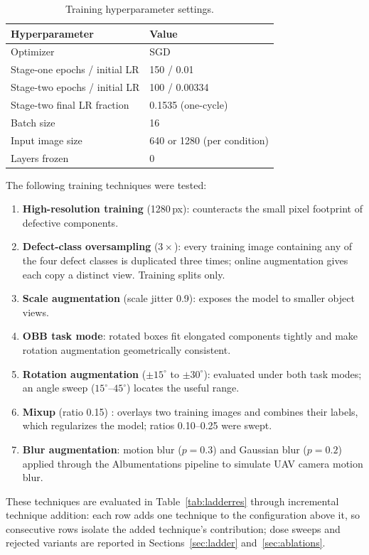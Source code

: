 \documentclass[conference]{IEEEtran}
\begin{document}
\begin{table}[t]
\caption{Training hyperparameter settings.}
\label{tab:hyper}
\centering
\footnotesize
\begin{tabular}{ll}
\toprule
Hyperparameter & Value \\
\midrule
Optimizer & SGD \\
Stage-one epochs / initial LR & 150 / 0.01 \\
Stage-two epochs / initial LR & 100 / 0.00334 \\
Stage-two final LR fraction & 0.1535 (one-cycle) \\
Batch size & 16 \\
Input image size & 640 or 1280 (per condition) \\
Layers frozen & 0 \\
\bottomrule
\end{tabular}
\end{table}

The following training techniques were tested:
\begin{enumerate}
\item \textbf{High-resolution training} (1280\,px): counteracts the small pixel footprint of defective components.
\item \textbf{Defect-class oversampling} ($3\times$): every training image containing any of the four defect classes is duplicated three times; online augmentation gives each copy a distinct view. Training splits only.
\item \textbf{Scale augmentation} (scale jitter 0.9): exposes the model to smaller object views.
\item \textbf{OBB task mode}: rotated boxes fit elongated components tightly and make rotation augmentation geometrically consistent.
\item \textbf{Rotation augmentation} ($\pm15^\circ$ to $\pm30^\circ$): evaluated under both task modes; an angle sweep ($15^\circ$--$45^\circ$) locates the useful range.
\item \textbf{Mixup} (ratio 0.15) \cite{zhang2018mixup}: overlays two training images and combines their labels, which regularizes the model; ratios 0.10--0.25 were swept.
\item \textbf{Blur augmentation}: motion blur ($p{=}0.3$) and Gaussian blur ($p{=}0.2$) applied through the Albumentations pipeline \cite{buslaev2020albumentations} to simulate UAV camera motion blur.
\end{enumerate}
These techniques are evaluated in Table~\ref{tab:ladderres} through incremental technique addition: each row adds one technique to the configuration above it, so consecutive rows isolate the added technique's contribution; dose sweeps and rejected variants are reported in Sections~\ref{sec:ladder} and~\ref{sec:ablations}.
\end{document}
